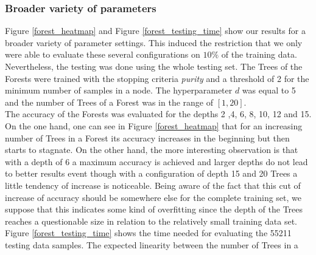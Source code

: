 \documentclass[twocolumn]{article}
\begin{document}
\subsubsection{Broader variety of parameters}
Figure \ref{forest_heatmap} and Figure \ref{forest_testing_time} show our results for a broader variety of parameter settings. This induced the restriction that we only were able to evaluate these several configurations on $10\%$ of the training data. Nevertheless, the testing was done using the whole testing set. The Trees of the Forests were trained with the stopping criteria \textit{purity} and a threshold of 2 for the minimum number of samples in a node. The hyperparameter $d$ was equal to 5 and the number of Trees of a Forest was in the range of $[1,20]$.\\
The accuracy of the Forests was evaluated for the depths 2 ,4, 6, 8, 10, 12 and 15. On the one hand, one can see in Figure \ref{forest_heatmap} that for an increasing number of Trees in a Forest its accuracy increases in the beginning but then starts to stagnate. On the other hand, the more interesting observation is that with a depth of 6 a maximum accuracy is achieved and larger depths do not lead to better results event though with a configuration of depth 15 and 20 Trees a little tendency of increase is noticeable. Being aware of the fact that this cut of increase of accuracy should be somewhere else for the complete training set, we suppose that this indicates some kind of overfitting since the depth of the Trees reaches a questionable size in relation to the relatively small training data set.\\
Figure \ref{forest_testing_time} shows the time needed for evaluating the 55211 testing data samples. The expected linearity between the number of Trees in a
\end{document}

